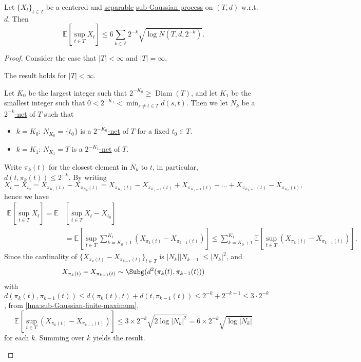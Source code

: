 \begin{theorem}\label{thm:Dudley-entropy-bound}
	Let \(\{ X_t \} _{t\in T}\) be a centered and \hyperref[def:separable]{separable} \hyperref[def:sub-Gaussian-process]{sub-Gaussian process} on \((T, d)\) w.r.t.\ \(d\). Then
	\[
		\mathbb{E}_{}\left[\sup _{t\in T} X_t \right] \leq 6 \sum_{k\in \mathbb{Z} } 2^{-k} \sqrt{\log N(T, d, 2^{-k})} .
	\]
\end{theorem}
\begin{proof}
	Consider the case that \(\vert T \vert < \infty \) and \(\vert T \vert = \infty \).

	\begin{claim}
		The result holds for \(\vert T \vert < \infty \).
	\end{claim}
	\begin{explanation}
		Let \(K_0\) be the largest integer such that \(2^{-K_0} \geq \mathop{\mathrm{Diam}}(T) \), and let \(K_1\) be the smallest integer such that \(0 < 2^{-K_1} < \min _{s \neq t\in T} d(s, t)\). Then we let \(N_k\) be a \hyperref[def:eps-net]{\(2^{-k}\)-net} of \(T\) such that
		\begin{itemize}
			\item \(k = K_0\): \(N_{K_0} = \{ t_0 \} \) is a \hyperref[def:eps-net]{\(2^{-K_0}\)-net} of \(T\) for a fixed \(t_0\in T\).
			\item \(k = K_1\): \(N_{K_1} = T\) is a \hyperref[def:eps-net]{\(2^{-K_1}\)-net} of \(T\).
		\end{itemize}
		Write \(\pi _k(t)\) for the closest element in \(N_k\) to \(t\), in particular, \(d(t, \pi _k(t)) \leq 2^{-k}\). By writing
		\[
			X_t - X_{t_0}
			= X_{\pi _{K_1} (t)} - X_{\pi _{K_0} (t)}
			= X_{\pi _{K_1}(t)} - X_{\pi _{K_1 - 1} (t)} + X_{\pi _{K_1 - 1} (t)} - \dots + X_{\pi _{K_0 + 1} (t)} - X_{\pi _{K_0} (t)},
		\]
		hence we have
		\[
			\begin{split}
				\mathbb{E}_{}\left[\sup _{t\in T} X_t \right]
				= \mathbb{E}_{}&\left[\sup _{t\in T} X_t - X_{t_0} \right]\\
				&= \mathbb{E}_{}\left[\sup _{t\in T} \sum_{k=K_0 + 1}^{K_1} \left( X_{\pi _k (t)} - X_{\pi _{k-1}(t)} \right) \right]
				\leq \sum_{k=K_0 + 1}^{K_1} \mathbb{E}_{}\left[\sup _{t\in T} \left( X_{\pi _k(t)} - X_{\pi _{k-1} (t)} \right) \right].
			\end{split}
		\]
		Since the cardinality of \(\{ X_{\pi _k(t)} - X_{\pi _{k-1} (t)} \}_{t\in T}\) is \(\vert N_k \vert \vert N_{k-1} \vert \leq \vert N_k \vert ^2\), and
		\[
			X_{\pi _k(t)} - X_{\pi _{k-1}(t)} \sim \Subg(d^2(\pi _k(t), \pi _{k-1}(t)))
		\]
		with \(d(\pi _k(t), \pi _{k-1}(t)) \leq d(\pi _k(t), t) + d(t, \pi _{k-1}(t)) \leq 2^{-k} + 2^{-k+1} \leq 3\cdot 2^{-k}\), from \autoref{lma:sub-Gaussian-finite-maximum},
		\[
			\mathbb{E}_{}\left[\sup _{t\in T} \left( X_{\pi _k(t)} - X_{\pi _{k-1}(t)} \right) \right]
			\leq 3 \times 2^{-k} \sqrt{2 \log \vert N_k \vert ^2}
			= 6 \times 2^{-k} \sqrt{\log \vert N_k \vert }
		\]
		for each \(k\). Summing over \(k\) yields the result.
	\end{explanation}


\end{proof}
